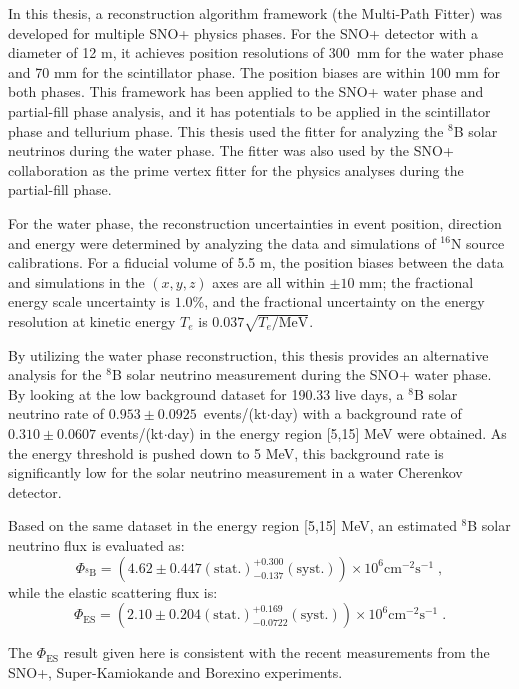In this thesis, a reconstruction algorithm framework (the Multi-Path Fitter) was developed for multiple SNO+ physics phases. For the SNO+ detector with a diameter of 12 m, it achieves position resolutions of 300~mm for the water phase and 70 mm for the scintillator phase. The position biases are within 100 mm for both phases. This framework has been applied to the SNO+ water phase and partial-fill phase analysis, and it has potentials to be applied in the scintillator phase and tellurium phase. This thesis used the fitter for analyzing the $^8$B solar neutrinos during the water phase. The fitter was also used by the SNO+ collaboration as the prime vertex fitter for the physics analyses during the partial-fill phase.

For the water phase, the reconstruction uncertainties in event position, direction and energy were determined by analyzing the data and simulations of $^{16}$N source calibrations. For a fiducial volume of 5.5 m, the position biases between the data and simulations in the $(x,y,z)$ axes are all within $\pm10$ mm; the fractional energy scale uncertainty is $1.0$\%, and the fractional uncertainty on the energy resolution at kinetic energy $T_e$ is $0.037\sqrt{T_e/\mathrm{MeV}}$.

By utilizing the water phase reconstruction, this thesis provides an alternative analysis for the $^8$B solar neutrino measurement during the SNO+ water phase. By looking at the low background dataset for 190.33 live days, a $^8$B solar neutrino rate of $0.953\pm0.0925$~events/(kt$\cdot$day) with a background rate of $0.310\pm 0.0607$ events/(kt$\cdot$day) in the energy region [5,15] MeV were obtained. As the energy threshold is pushed down to 5 MeV, this background rate is significantly low for the solar neutrino measurement in a water Cherenkov detector.

Based on the same dataset in the energy region [5,15] MeV, an estimated $^8$B solar neutrino flux is evaluated as: 
\begin{equation*}
\Phi_{\mathrm{^8B}}=(4.62 \pm 0.447 \mathrm{(stat.)}^{+0.300}_{-0.137}\mathrm{(syst.)})\times 10^6 \mathrm{cm}^{-2}\mathrm{s}^{-1}\;, 
\end{equation*}
while the elastic scattering flux is:
\begin{equation*}
\Phi_{\mathrm{ES}}=(2.10 \pm 0.204\mathrm{(stat.)}^{+0.169}_{-0.0722}\mathrm{(syst.)})\times 10^6 \mathrm{cm}^{-2}\mathrm{s}^{-1}\;.
\end{equation*}

The $\Phi_{\mathrm{ES}}$ result given here is consistent with the recent measurements from the SNO+, Super-Kamiokande and Borexino experiments.